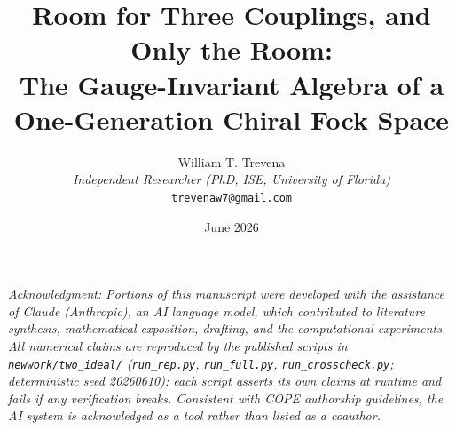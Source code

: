 \documentclass[11pt]{article}
\title{Room for Three Couplings, and Only the Room:\\ The Gauge-Invariant Algebra of a One-Generation Chiral Fock Space}
\author{William T. Trevena\\[3pt]
{\small\itshape Independent Researcher (PhD, ISE, University of Florida)}\\
{\small\texttt{trevenaw7@gmail.com}}}
\date{June 2026}
\begin{document}
\maketitle

{\small\itshape\sloppy Acknowledgment: Portions of this manuscript were developed with the assistance of Claude (Anthropic), an AI language model, which contributed to literature synthesis, mathematical exposition, drafting, and the computational experiments. All numerical claims are reproduced by the published scripts in \texttt{newwork/two\_ideal/} (\texttt{run\_rep.py}, \texttt{run\_full.py}, \texttt{run\_crosscheck.py}; deterministic seed 20260610): each script asserts its own claims at runtime and fails if any verification breaks. Consistent with COPE authorship guidelines, the AI system is acknowledged as a tool rather than listed as a coauthor.\par}
\end{document}
